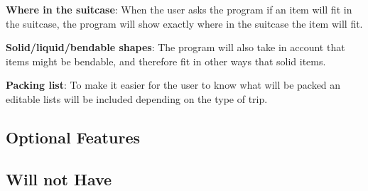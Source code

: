 \textbf{Where in the suitcase}:
When the user asks the program if an item will fit in the suitcase, the program will show exactly where in the suitcase the item will fit.
\newline

\textbf{Solid/liquid/bendable shapes}:
The program will also take in account that items might be bendable, and therefore fit in other ways that solid items. 
\newline

\textbf{Packing list}:
To make it easier for the user to know what will be packed an editable lists will be included depending on the type of trip.
\newline


\subsection{Optional Features}

\subsection{Will not Have}

